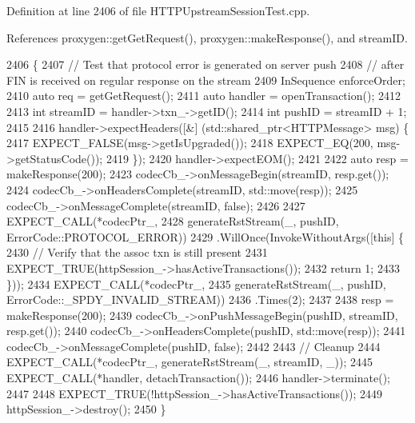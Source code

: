 Definition at line 2406 of file H\+T\+T\+P\+Upstream\+Session\+Test.\+cpp.



References proxygen\+::get\+Get\+Request(), proxygen\+::make\+Response(), and stream\+ID.


\begin{DoxyCode}
2406                                                   \{
2407   \textcolor{comment}{// Test that protocol error is generated on server push}
2408   \textcolor{comment}{// after FIN is received on regular response on the stream}
2409   InSequence enforceOrder;
2410   \textcolor{keyword}{auto} req = getGetRequest();
2411   \textcolor{keyword}{auto} handler = openTransaction();
2412 
2413   \textcolor{keywordtype}{int} streamID = handler->txn\_->getID();
2414   \textcolor{keywordtype}{int} pushID = streamID + 1;
2415 
2416   handler->expectHeaders([&] (std::shared\_ptr<HTTPMessage> msg) \{
2417       EXPECT\_FALSE(msg->getIsUpgraded());
2418       EXPECT\_EQ(200, msg->getStatusCode());
2419     \});
2420   handler->expectEOM();
2421 
2422   \textcolor{keyword}{auto} resp = makeResponse(200);
2423   codecCb\_->onMessageBegin(streamID, resp.get());
2424   codecCb\_->onHeadersComplete(streamID, std::move(resp));
2425   codecCb\_->onMessageComplete(streamID, \textcolor{keyword}{false});
2426 
2427   EXPECT\_CALL(*codecPtr\_,
2428               generateRstStream(\_, pushID, ErrorCode::PROTOCOL\_ERROR))
2429     .WillOnce(InvokeWithoutArgs([\textcolor{keyword}{this}] \{
2430             \textcolor{comment}{// Verify that the assoc txn is still present}
2431             EXPECT\_TRUE(httpSession\_->hasActiveTransactions());
2432             \textcolor{keywordflow}{return} 1;
2433           \}));
2434   EXPECT\_CALL(*codecPtr\_,
2435               generateRstStream(\_, pushID, ErrorCode::\_SPDY\_INVALID\_STREAM))
2436     .Times(2);
2437 
2438   resp = makeResponse(200);
2439   codecCb\_->onPushMessageBegin(pushID, streamID, resp.get());
2440   codecCb\_->onHeadersComplete(pushID, std::move(resp));
2441   codecCb\_->onMessageComplete(pushID, \textcolor{keyword}{false});
2442 
2443   \textcolor{comment}{// Cleanup}
2444   EXPECT\_CALL(*codecPtr\_, generateRstStream(\_, streamID, \_));
2445   EXPECT\_CALL(*handler, detachTransaction());
2446   handler->terminate();
2447 
2448   EXPECT\_TRUE(!httpSession\_->hasActiveTransactions());
2449   httpSession\_->destroy();
2450 \}
\end{DoxyCode}
